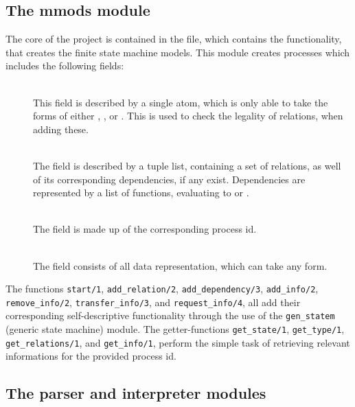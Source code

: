 \subsection{The mmods module}
The core of the project is contained in the  file, which contains the functionality, that creates the finite state machine models. This module creates processes which includes the following fields:
\begin{description}
	\item[]\ \\
		This field is described by a single atom, which is only able to take the forms of either , , or . This is used to check the legality of relations, when adding these.
	\item[]\ \\
		The  field is described by a tuple list, containing a set of relations, as well of its corresponding dependencies, if any exist. Dependencies are represented by a list of functions, evaluating to  or .
	\item[]\ \\
		The  field is made up of the corresponding process id.
	\item[]\ \\
		The  field consists of all data representation, which can take any form.
\end{description}
The functions \lstinline{start/1}, \lstinline{add_relation/2}, \lstinline{add_dependency/3}, \lstinline{add_info/2}, \linebreak \lstinline{remove_info/2}, \lstinline{transfer_info/3}, and \lstinline{request_info/4}, all add their corresponding self-descriptive functionality through the use of the \lstinline{gen_statem} (generic state machine) module. The getter-functions \lstinline{get_state/1}, \lstinline{get_type/1}, \lstinline{get_relations/1}, and \lstinline{get_info/1}, perform the simple task of retrieving relevant informations for the provided process id.
\subsection{The parser and interpreter modules}

